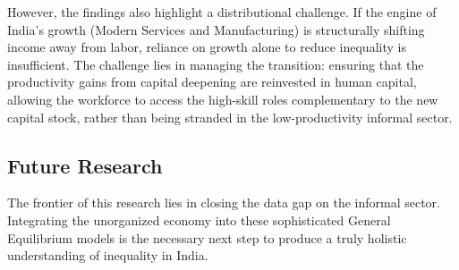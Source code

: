 \documentclass[12pt]{article}
\begin{document}
However, the findings also highlight a distributional challenge. If the engine of India's growth (Modern Services and Manufacturing) is structurally shifting income away from labor, reliance on growth alone to reduce inequality is insufficient. The challenge lies in managing the transition: ensuring that the productivity gains from capital deepening are reinvested in human capital, allowing the workforce to access the high-skill roles complementary to the new capital stock, rather than being stranded in the low-productivity informal sector.

\subsection{Future Research}
The frontier of this research lies in closing the data gap on the informal sector. Integrating the unorganized economy into these sophisticated General Equilibrium models is the necessary next step to produce a truly holistic understanding of inequality in India.

\newpage

\end{document}
